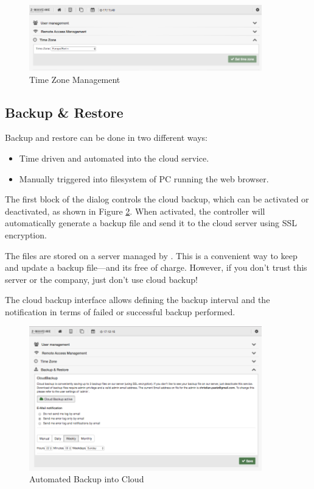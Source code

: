 \begin{figure}
\begin{center}
\includegraphics[width=0.9\textwidth]{pngs/cap4/shui73.png}
\caption{Time Zone Management}
\label{shui73}
\end{center}
\end{figure}

\subsection{Backup \& Restore}

Backup and restore can be done in two different ways:

\begin{itemize}
\item Time driven and automated into the \zway cloud service.
\item Manually triggered into filesystem of PC running the web browser.
\end{itemize}

The first block of the  dialog controls the cloud backup, which 
can be activated or deactivated, as shown in Figure \ref{shui74}. When activated, the 
controller will automatically generate a backup file and send it to the cloud server 
using SSL encryption.

The files are stored on a server managed by \zwaveme. This is a convenient way to keep 
and update a backup file---and its free of charge. However, if you don’t trust this 
server or the company, just don’t use cloud backup!

The cloud backup interface allows defining the backup interval and the notification in 
terms of failed or successful backup performed.

\begin{figure}
\begin{center}
\includegraphics[width=0.9\textwidth]{pngs/cap4/shui74.png}
\caption{Automated Backup into Cloud}
\label{shui74}
\end{center}
\end{figure}

